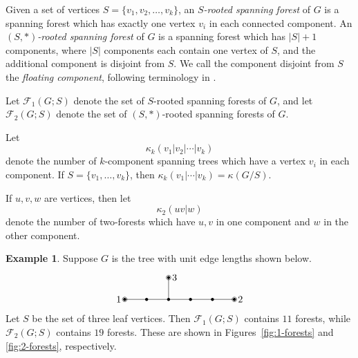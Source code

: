 \documentclass{amsart}
\theoremstyle{definition}
\newtheorem{eg}[thm]{Example}
\newcommand{\trees}{\mathcal{F}_1}
\newcommand{\forests}{\mathcal{F}}
\begin{document}
Given a set of vertices $S = \{v_1, v_2, \ldots, v_k\}$,
an {\em $S$-rooted spanning forest} of $G$ 
is a spanning forest which has exactly one vertex $v_i$ in each connected component.
An {\em $(S,*)$-rooted spanning forest} of $G$ is a spanning forest which has $|S|+1$ components, where $|S|$ components each contain one vertex of $S$, and the additional component is disjoint from $S$.
We call the component disjoint from $S$ the {\em floating component}, following terminology in \cite{kassel-kenyon-wu}.

Let $\trees(G;S)$ denote the set of $S$-rooted spanning forests of $G$,
and let $\forests_2(G;S)$ denote the set of $(S,*)$-rooted spanning forests of $G$.

Let 
$$
\kappa_k(v_1|v_2| \cdots | v_k)
$$
denote the number of $k$-component spanning trees which have a vertex $v_i$ in each component.
If $S = \{v_1,\ldots, v_k\}$,
then $\kappa_k(v_1|\cdots| v_k) = \kappa(G/S)$.

If $u, v, w$ are vertices, then let
$$
\kappa_2(u v | w)
$$
denote the number of two-forests which have $u, v$ in one component and $w$ in the other component.

\begin{eg}
Suppose $G$ is the tree with unit edge lengths shown below.
\[
\begin{tikzpicture}[scale=0.8]
	\coordinate (1) at (0,0);
	\coordinate (A) at (1,0);
	\coordinate (B) at (2,0);
	\coordinate (C) at (3,0);
	\coordinate (D) at (4,0);
	\coordinate (2) at (5,0);
	\coordinate (3) at (2,1);
	
	\foreach \c in {1,2,3,A,B,C,D} {
		\fill (\c) circle (2pt);
	}
	\foreach \c in {1,2,3} {
		\draw (\c) circle (3pt);
	}

	\draw (1) -- (A);
	\draw (A) -- (B);
	\draw (B) -- (3);
	\draw (B) -- (C);
	\draw (C) -- (D);
	\draw (D) -- (2);
	
	\foreach \c/\d in {1/left,2/right,3/right} {
		\node[\d=0.2] at (\c) {$\c$};
	}
\end{tikzpicture}
\]
Let $S$ be the set of three leaf vertices.
Then $\trees(G;S)$ contains $11$ forests,
while $\forests_2(G;S)$ contains $19$ forests.
These are shown in Figures~\ref{fig:1-forests} and \ref{fig:2-forests}, respectively.
\end{eg}
\end{document}

